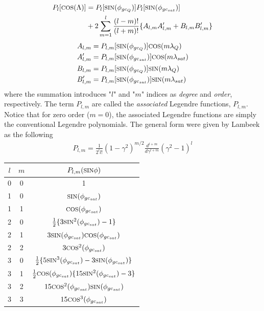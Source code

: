 \begin{multicols}{2}
\begin{gather}
    \begin{split}
        P_l[\text{\footnotesize{COS}}(\Lambda)] &= P_l[\text{\footnotesize{SIN}}(\phi_{gc_{Q}})]P_l[\text{\footnotesize{SIN}}(\phi_{gc_{sat}})]\\
                    &+2\sum_{m=1}^{l}\frac{(l-m)!}{(l+m)!}\{A_{l,m}A'_{l,m}+B_{l,m}B'_{l,m}\}
    \end{split}
\end{gather}
\begin{gather*}
    \begin{split}
        A_{l,m} &= P_{l,m}[\text{\footnotesize{SIN}}(\phi_{gc_{Q}})]\text{\footnotesize{COS}}(m\lambda_Q)\\
        A'_{l,m} &= P_{l,m}[\text{\footnotesize{SIN}}(\phi_{gc_{sat}})]\text{\footnotesize{COS}}(m\lambda_{sat})\\
        B_{l,m} &= P_{l,m}[\text{\footnotesize{SIN}}(\phi_{gc_{Q}})]\text{\footnotesize{SIN}}(m\lambda_Q)\\
        B'_{l,m} &= P_{l,m}[\text{\footnotesize{SIN}}(\phi_{gc_{sat}})]\text{\footnotesize{SIN}}(m\lambda_{sat})\\
    \end{split}
\end{gather*}
where the summation introduces "$l$" and "$m$" indices as \textit{degree} and \textit{order}, respectively. The term $P_{l,m}$ are called the \textit{associated} Legendre functions, $P_{l,m}$. Notice that for zero order ($m=0$), the associated Legendre functions are simply the conventional Legendre polynomials. The general form were given by Lambeek as the following
\begin{gather*}
    P_{l,m} = \frac{1}{2^ll!}(1-\gamma^2)^{m/2}\frac{d^{l+m}}{d\gamma^{l+m}}(\gamma^2-1)^l
\end{gather*}

\begin{center}
    \begin{tabular}{ccc}
        $l$ & $m$ & $P_{l,m}(\text{\footnotesize{SIN}}\phi)$ \\[0.1cm]
        \hline\hline
        0   & 0   & 1 \\[0.1cm]
        \hline
        1   & 0   & $\text{\footnotesize{SIN}}(\phi_{gc_{sat}})$ \\[0.1cm]
        1   & 1   & $\text{\footnotesize{COS}}(\phi_{gc_{sat}})$ \\[0.1cm]
        \hline
        2   & 0   & $\frac{1}{2}\{3\text{\footnotesize{SIN}}^2(\phi_{gc_{sat}})-1\}$ \\[0.1cm]
        2   & 1   & $3\text{\footnotesize{SIN}}(\phi_{gc_{sat}})\text{\footnotesize{COS}}(\phi_{gc_{sat}})$ \\[0.1cm]
        2   & 2   & $3\text{\footnotesize{COS}}^2(\phi_{gc_{sat}})$ \\[0.1cm]
        \hline
        3   & 0   & $\frac{1}{2}\{5\text{\footnotesize{SIN}}^3(\phi_{gc_{sat}})-3\text{\footnotesize{SIN}}(\phi_{gc_{sat}})\}$ \\[0.1cm]
        3   & 1   & $\frac{1}{2}\text{\footnotesize{COS}}(\phi_{gc_{sat}})\{15\text{\footnotesize{SIN}}^2(\phi_{gc_{sat}})-3\}$ \\[0.1cm]
        3   & 2   & $15\text{\footnotesize{COS}}^2(\phi_{gc_{sat}})\text{\footnotesize{SIN}}(\phi_{gc_{sat}})$ \\[0.1cm]
        3   & 3   & $15\text{\footnotesize{COS}}^3(\phi_{gc_{sat}})$ \\[0.1cm]
        \hline\hline
    \end{tabular}
\end{center}



\end{multicols}
